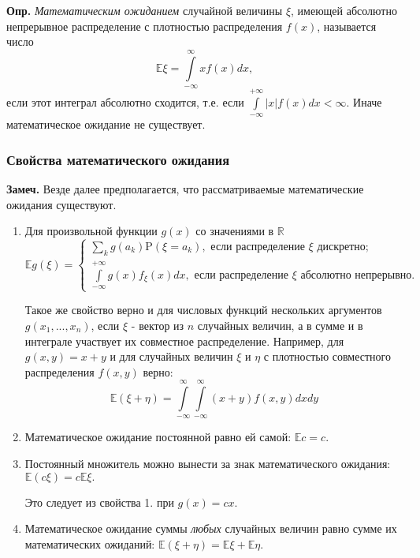 \documentclass[oneside,final,14pt]{extreport}
\newcommand\mydef{{\bf Опр.}}
\newcommand\mynote{{\bf Замеч.}}
\theoremstyle{definition}
\begin{document}
\mydef{} {\it Математическим ожиданием} случайной величины $\xi$, имеющей абсолютно непрерывное распределение с плотностью распределения $f(x)$, называется число
$$\mathbb{E} \xi=\int\limits_{-\infty}^{\infty} x f(x) dx,$$
если этот интеграл абсолютно сходится, т.е. если $\int\limits_{-\infty}^{+\infty}|x|f(x)dx < \infty.$ Иначе математическое ожидание не существует.

\subsubsection{Свойства математического ожидания}
\mynote{} Везде далее предполагается, что рассматриваемые математические ожидания существуют.
\begin{enumerate}
    \item Для произвольной функции $g(x)$ со значениями в $\mathbb{R}$
    $$\mathbb{E} g(\xi)=\left\{\begin{array}{l}\sum\limits_{k} g\left(a_{k}\right) \mathrm{P}\left(\xi=a_{k}\right), \text { если распределение } \xi \text { дискретно; } \\ \int\limits_{-\infty}^{+\infty} g(x) f_{\xi}(x) d x, \text { если распределение } \xi \text { абсолютно непрерывно. }\end{array}\right.$$
    
    Такое же свойство верно и для числовых функций нескольких аргументов $g(x_1, ...,x_n)$, если $\xi$ - вектор из $n$ случайных величин, а в сумме и в интеграле участвует их совместное распределение. Например, для $g(x,y) = x + y$ и для случайных величин $\xi$ и $\eta$ с плотностью совместного распределения $f(x,y)$ верно: 
    \begin{equation}
        \mathbb{E}(\xi+\eta)=\int\limits_{-\infty}^{\infty} \int\limits_{-\infty}^{\infty}(x+y) f(x, y) d x d y
    \end{equation}
    
    \item Математическое ожидание постоянной равно ей самой: $\mathbb{E} c=c.$
    \item Постоянный множитель можно вынести за знак математического ожидания: $\mathbb{E}(c\xi) = c\mathbb{E}\xi.$
    
    Это следует из свойства 1. при $g(x) = cx$.
    \item Математическое ожидание суммы {\it любых} случайных величин равно сумме их математических ожиданий: $\mathbb{E}(\xi + \eta) = \mathbb{E}\xi + \mathbb{E}\eta.$
    

\end{enumerate}
\end{document}
